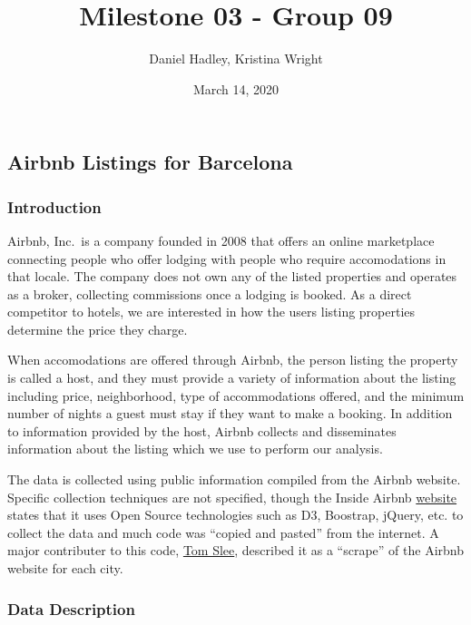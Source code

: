 \documentclass[]{article}
\title{Milestone 03 - Group 09}
\author{Daniel Hadley, Kristina Wright}
\date{March 14, 2020}
\begin{document}
\maketitle

\hypertarget{airbnb-listings-for-barcelona}{%
\subsection{Airbnb Listings for
Barcelona}\label{airbnb-listings-for-barcelona}}

\hypertarget{introduction}{%
\subsubsection{Introduction}\label{introduction}}

Airbnb, Inc.~is a company founded in 2008 that offers an online
marketplace connecting people who offer lodging with people who require
accomodations in that locale. The company does not own any of the listed
properties and operates as a broker, collecting commissions once a
lodging is booked. As a direct competitor to hotels, we are interested
in how the users listing properties determine the price they charge.

When accomodations are offered through Airbnb, the person listing the
property is called a host, and they must provide a variety of
information about the listing including price, neighborhood, type of
accommodations offered, and the minimum number of nights a guest must
stay if they want to make a booking. In addition to information provided
by the host, Airbnb collects and disseminates information about the
listing which we use to perform our analysis.

The data is collected using public information compiled from the Airbnb
website. Specific collection techniques are not specified, though the
Inside Airbnb \href{http://insideairbnb.com/behind.html}{website} states
that it uses Open Source technologies such as D3, Boostrap, jQuery, etc.
to collect the data and much code was ``copied and pasted'' from the
internet. A major contributer to this code,
\href{http://tomslee.net/category/airbnb-data}{Tom Slee}, described it
as a ``scrape'' of the Airbnb website for each city.

\hypertarget{data-description}{%
\subsubsection{Data Description}\label{data-description}}
\end{document}
